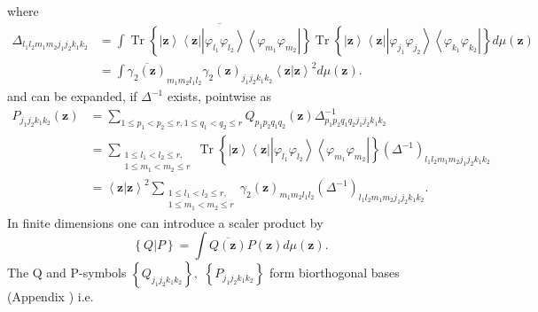 \documentclass[aps,preprint]{revtex4}%
\begin{document}
where
\begin{align}
\Delta_{l_{1}l_{2}m_{1}m_{2}j_{1}j_{2}k_{1}k_{2}}  &  =\int\overline
{\operatorname*{Tr}\left\{  \left\vert \mathbf{z}\right\rangle \left\langle
\mathbf{z}\right\vert \left\vert \varphi_{l_{1}}\varphi_{l_{2}}\right\rangle
\left\langle \varphi_{m_{1}}\varphi_{m_{2}}\right\vert \right\}
}\operatorname*{Tr}\left\{  \left\vert \mathbf{z}\right\rangle \left\langle
\mathbf{z}\right\vert \left\vert \varphi_{j_{1}}\varphi_{j_{2}}\right\rangle
\left\langle \varphi_{k_{1}}\varphi_{k_{2}}\right\vert \right\}  d\mu\left(
\mathbf{z}\right) \nonumber\\
&  =\int\overline{\gamma_{2}\left(  \mathbf{z}\right)  }_{m_{1}m_{2}l_{1}%
l_{2}}\gamma_{2}\left(  \mathbf{z}\right)  _{j_{1}j_{2}k_{1}k_{2}}\left\langle
\mathbf{z\left\vert \mathbf{z}\right.  }\right\rangle ^{2}d\mu\left(
\mathbf{z}\right)  .
\end{align}
and can be expanded, if $\Delta^{-1}$ exists, pointwise as
\begin{align}
P_{j_{1}j_{2}k_{1}k_{2}}\left(  \mathbf{z}\right)   &  =\sum_{1\leq
p_{1}<p_{2}\leq r,1\leq q_{1}<q_{2}\leq r}Q_{p_{1}p_{2}q_{1}q_{2}}\left(
\mathbf{z}\right)  \Delta_{p_{1}p_{2}q_{1}q_{2}j_{1}j_{2}k_{1}k_{2}}%
^{-1}\nonumber\\
&  =\sum_{\substack{1\leq l_{1}<l_{2}\leq r,\\1\leq m_{1}<m_{2}\leq
r}}\operatorname*{Tr}\left\{  \left\vert \mathbf{z}\right\rangle \left\langle
\mathbf{z}\right\vert \left\vert \varphi_{l_{1}}\varphi_{l_{2}}\right\rangle
\left\langle \varphi_{m_{1}}\varphi_{m_{2}}\right\vert \right\}  \left(
\Delta^{-1}\right)  _{l_{1}l_{2}m_{1}m_{2}j_{1}j_{2}k_{1}k_{2}}\nonumber\\
&  =\left\langle \mathbf{z\left\vert \mathbf{z}\right.  }\right\rangle
^{2}\sum_{\substack{1\leq l_{1}<l_{2}\leq r,\\1\leq m_{1}<m_{2}\leq r}%
}\gamma_{2}\left(  \mathbf{z}\right)  _{m_{1}m_{2}l_{1}l_{2}}\left(
\Delta^{-1}\right)  _{l_{1}l_{2}m_{1}m_{2}j_{1}j_{2}k_{1}k_{2}}.
\end{align}
In finite dimensions one can introduce a scaler product by
\begin{equation}
\left\{  \left.  Q\right\vert P\right\}  =\int\overline{Q\left(
\mathbf{z}\right)  }P\left(  \mathbf{z}\right)  d\mu\left(  \mathbf{z}\right)
.
\end{equation}
The Q and P-symbols $\left\{  Q_{j_{1}j_{2}k_{1}k_{2}}\right\}  ,$ $\left\{
P_{j_{1}j_{2}k_{1}k_{2}}\right\}  $ form biorthogonal bases (Appendix ) i.e.
\end{document}
